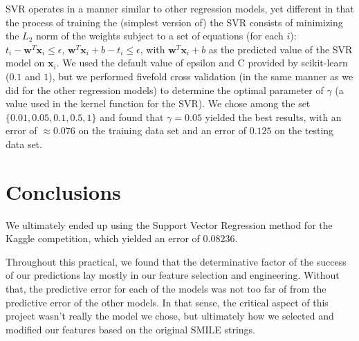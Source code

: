 \documentclass[11pt]{article}
\begin{document}
SVR operates in a manner similar to other regression models, yet different in that the process of training the (simplest version of) the SVR consists of minimizing the $L_2$ norm of the weights subject to a set of equations (for each $i$): $t_i - \textbf{w}^T\textbf{x}_i \leq \epsilon$, $\textbf{w}^T\textbf{x}_i + b - t_i \leq \epsilon$, with $\textbf{w}^T\textbf{x}_i + b$ as the predicted value of the SVR model on $\textbf{x}_i$. We used the default value of epsilon and C provided by scikit-learn ($0.1$ and $1$), but we performed fivefold cross validation (in the same manner as we did for the other regression models) to determine the optimal parameter of $\gamma$ (a value used in the kernel function for the SVR). We chose among the set $\{0.01, 0.05, 0.1, 0.5, 1\}$ and found that $\gamma = 0.05$ yielded the best results, with an error of $\approx 0.076$ on the training data set and an error of $0.125$ on the testing data set.

\section{Conclusions}

We ultimately ended up using the Support Vector Regression method for the Kaggle competition, which yielded an error of $0.08236$.

Throughout this practical, we found that the determinative factor of the success of our predictions lay mostly in our feature selection and engineering. Without that, the predictive error for each of the models was not too far of from the predictive error of the other models. In that sense, the critical aspect of this project wasn't really the model we chose, but ultimately how we selected and modified our features based on the original SMILE strings.
\end{document}
